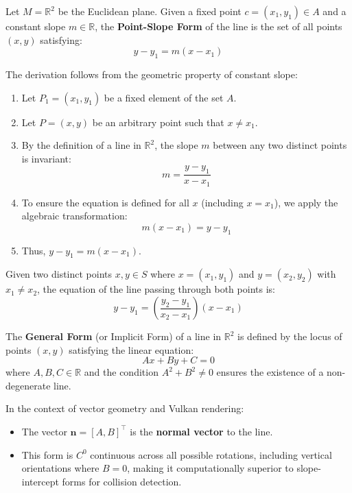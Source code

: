 \begin{definition}
Let $M = \mathbb{R}^2$ be the Euclidean plane. Given a fixed point $c = (x_1, y_1) \in A$ and a constant slope $m \in \mathbb{R}$, the \textbf{Point-Slope Form} of the line is the set of all points $(x, y)$ satisfying:
\[ y - y_1 = m(x - x_1) \]
\end{definition}

\begin{remark}
The derivation follows from the geometric property of constant slope:
\begin{enumerate}
    \item Let $P_1 = (x_1, y_1)$ be a fixed element of the set $A$.
    \item Let $P = (x, y)$ be an arbitrary point such that $x \neq x_1$.
    \item By the definition of a line in $\mathbb{R}^2$, the slope $m$ between any two distinct points is invariant:
    \[ m = \frac{y - y_1}{x - x_1} \]
    \item To ensure the equation is defined for all $x$ (including $x = x_1$), we apply the algebraic transformation:
    \[ m(x - x_1) = y - y_1 \]
    \item Thus, $y - y_1 = m(x - x_1)$.
\end{enumerate}
\end{remark}


\begin{definition}
Given two distinct points $x, y \in S$ where $x = (x_1, y_1)$ and $y = (x_2, y_2)$ with $x_1 \neq x_2$, the equation of the line passing through both points is:
\[ y - y_1 = \left( \frac{y_2 - y_1}{x_2 - x_1} \right)(x - x_1) \]
\end{definition}


\begin{definition}
The \textbf{General Form} (or Implicit Form) of a line in $\mathbb{R}^2$ is defined by the locus of points $(x, y)$ satisfying the linear equation:
\[ Ax + By + C = 0 \]
where $A, B, C \in \mathbb{R}$ and the condition $A^2 + B^2 \neq 0$ ensures the existence of a non-degenerate line.
\end{definition}

\begin{remark}
In the context of vector geometry and Vulkan rendering:
\begin{itemize}
    \item The vector $\mathbf{n} = [A, B]^\top$ is the \textbf{normal vector} to the line.
    \item This form is $C^0$ continuous across all possible rotations, including vertical orientations where $B=0$, making it computationally superior to slope-intercept forms for collision detection.
\end{itemize}
\end{remark}


